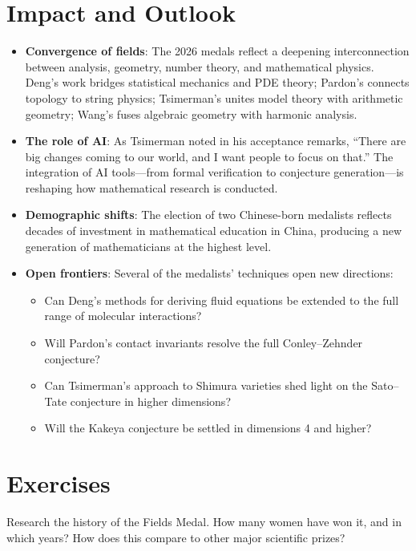\section{Impact and Outlook}

\begin{itemize}
\item \textbf{Convergence of fields}: The 2026 medals reflect a deepening interconnection between analysis, geometry, number theory, and mathematical physics. Deng's work bridges statistical mechanics and PDE theory; Pardon's connects topology to string physics; Tsimerman's unites model theory with arithmetic geometry; Wang's fuses algebraic geometry with harmonic analysis.
\item \textbf{The role of AI}: As Tsimerman noted in his acceptance remarks, ``There are big changes coming to our world, and I want people to focus on that.'' The integration of AI tools---from formal verification to conjecture generation---is reshaping how mathematical research is conducted.
\item \textbf{Demographic shifts}: The election of two Chinese-born medalists reflects decades of investment in mathematical education in China, producing a new generation of mathematicians at the highest level.
\item \textbf{Open frontiers}: Several of the medalists' techniques open new directions:
  \begin{itemize}
  \item Can Deng's methods for deriving fluid equations be extended to the full range of molecular interactions?
  \item Will Pardon's contact invariants resolve the full Conley--Zehnder conjecture?
  \item Can Tsimerman's approach to Shimura varieties shed light on the Sato--Tate conjecture in higher dimensions?
  \item Will the Kakeya conjecture be settled in dimensions 4 and higher?
  \end{itemize}
\end{itemize}

\section{Exercises}

\begin{exercise}[Basic]
Research the history of the Fields Medal. How many women have won it, and in which years? How does this compare to other major scientific prizes?
\end{exercise}

